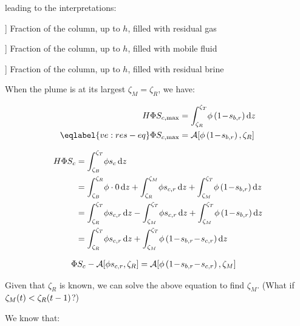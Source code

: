 \documentclass[12pt]{scrartcl}
\newcommand{\wid}[1]{\widthof{\bfseries {#1} \hspace{\labelsep}}}
\newcommand{\aleft}{\mathopen{}\mathclose\bgroup\left}  %
\newcommand{\aright}{\aftergroup\egroup\right}          %
\newcommand{\binop}[3]{#1\mkern1mu{#2}\mkern1mu #3}     %
\newcommand{\dual}[1]{\binop{1}{-}{#1}}                 %
\newcommand{\ddual}[2]{\binop{\binop{1}{-}{#1}}{-}{#2}} %
\newcommand{\intg}[4]{\int_{#1}^{#2}\!{#3}\,\mathrm{d}{#4}}   %
\newcommand{\Hei}{H}        %
\newcommand{\Por}{\Phi}     %
\newcommand{\por}{\phi}     %
\newcommand{\Sat}{S}        %
\newcommand{\sat}{s}        %
\newcommand{\sr}[1]{\sat_{#1,r}}    %
\newcommand{\tim}{t}        %
\newcommand{\Lev}{\zeta}    %
\newcommand{\Top}{T}        %
\newcommand{\Bot}{B}        %
\newcommand{\Res}{R}        %
\newcommand{\Mob}{M}        %
\newcommand{\dph}{z}        %
\newcommand{\nap}{c}        %
\newcommand{\wet}{b}        %
\newcommand{\avg}[2]{\mathcal{A}\aleft[#1, #2\aright]}  %
\newcommand{\h}{h}          %
\newcommand{\Satn}{\Sat_\nap}
\newcommand{\satn}{\sat_\nap}
\newcommand{\Satnmax}{\Sat_{\nap,\max}} %
\newcommand{\snr}{\sr{\nap}}    %
\newcommand{\swr}{\sr{\wet}}    %
\newcommand{\LevT}{\Lev_\Top}
\newcommand{\LevB}{\Lev_\Bot}
\newcommand{\LevM}{\Lev_\Mob}
\newcommand{\LevR}{\Lev_\Res}
\begin{document}
leading to the interpretations:

\begin{description}[labelwidth=\wid{\( \avg{ \por \left( \ddual{ \swr }{ \snr } \right) }{ \h } \)}]
\item[ \( \avg{ \por \left( \snr \right) }{ \h } \) ] Fraction of the column, up to \( \h \), filled with residual gas
\item[ \( \avg{ \por \left( \ddual{ \swr }{ \snr } \right) }{ \h } \) ] Fraction of the column, up to \( \h \), filled with mobile fluid
\item[ \( \avg{ \por \left( \dual{ \swr } \right) }{ \h } \) ] Fraction of the column, up to \( \h \), filled with residual brine
\end{description}

When the plume is at its largest \( \LevM = \LevR \), we have:

\begin{align}
\Hei \Por \Satnmax &= \intg{ \LevR }{ \LevT }{ \por \left( \dual{ \swr } \right) }{ \dph } \\
\eqlabel{ve:res-eq}
\Por \Satnmax &= \avg{ \por \left( \dual{ \swr } \right) }{ \LevR }
\end{align}

\begin{align}
\Hei \Por \Satn &= \intg{ \LevB }{ \LevT }{ \por \satn }{ \dph } \\
&= \intg{ \LevB }{ \LevR }{ \por \cdot 0 }{ \dph } + \intg{ \LevR }{ \LevM }{ \por \snr }{ \dph } + \intg{ \LevM }{ \LevT }{ \por \left( \dual{ \swr } \right) }{ \dph } \\
&= \intg{ \LevR }{ \LevT }{ \por \snr }{ \dph } - \intg{ \LevM }{ \LevT }{ \por \snr }{ \dph } + \intg{ \LevM }{ \LevT }{ \por \left( \dual{ \swr } \right) }{ \dph } \\
&= \intg{ \LevR }{ \LevT }{ \por \snr }{ \dph } + \intg{ \LevM }{ \LevT }{ \por \left( \ddual{ \swr }{ \snr } \right) }{ \dph }
\end{align}

\begin{align}
\Por \Satn - \avg{ \por \snr }{ \LevR } &= \avg{ \por \left( \ddual{ \swr }{ \snr } \right) }{ \LevM }
\end{align}

Given that \( \LevR \) is known, we can solve the above equation to find \( \LevM \). (What if \( \LevM \aleft( \tim \aright) < \LevR \aleft( \tim - 1 \aright) \)?)

We know that:
\end{document}
